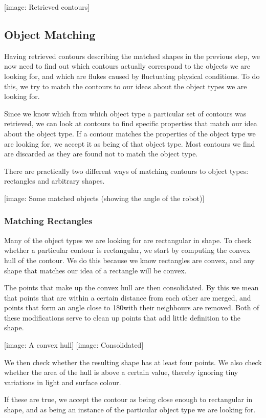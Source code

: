 \documentclass[10pt,twocolumn]{scrartcl}
\begin{document}
[image: Retrieved contours]

\subsection{Object Matching}
Having retrieved contours describing the matched shapes in the previous step, we now need to find out which contours actually correspond to the objects we are looking for, and which are flukes caused by fluctuating physical conditions. To do this, we try to match the contours to our ideas about the object types we are looking for.

Since we know which from which object type a particular set of contours was retrieved, we can look at contours to find specific properties that match our idea about the object type. If a contour matches the properties of the object type we are looking for, we accept it as being of that object type. Most contours we find are discarded as they are found not to match the object type.

There are practically two different ways of matching contours to object types: rectangles and arbitrary shapes.

[image: Some matched objects (showing the angle of the robot)]

\subsubsection{Matching Rectangles}
Many of the object types we are looking for are rectangular in shape. To check whether a particular contour is rectangular, we start by computing the convex hull of the contour. We do this because we know rectangles are convex, and any shape that matches our idea of a rectangle will be convex.

The points that make up the convex hull are then consolidated. By this we mean that points that are within a certain distance from each other are merged, and points that form an angle close to 180\degree with their neighbours are removed. Both of these modifications serve to clean up points that add little definition to the shape.

[image: A convex hull] [image: Consolidated]

We then check whether the resulting shape has at least four points. We also check whether the area of the hull is above a certain value, thereby ignoring tiny variations in light and surface colour.

If these are true, we accept the contour as being close enough to rectangular in shape, and as being an instance of the particular object type we are looking for. 
\end{document}
